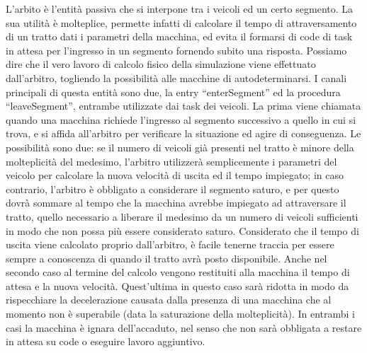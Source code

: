 L’arbito è l’entità passiva che si interpone tra i veicoli ed un certo segmento. La sua utilità è molteplice, permette infatti di calcolare il tempo di attraversamento di un tratto dati i parametri della macchina, ed evita il formarsi di code di task in attesa per l’ingresso in un segmento fornendo subito una risposta. Possiamo dire che il vero lavoro di calcolo fisico della simulazione viene effettuato dall’arbitro, togliendo la possibilità alle macchine di autodeterminarsi.
I canali principali di questa entità sono due, la entry “enterSegment” ed la procedura “leaveSegment”, entrambe utilizzate dai task dei veicoli.
La prima viene chiamata quando una macchina richiede l’ingresso al segmento successivo a quello in cui si trova, e si affida all’arbitro per verificare la situazione ed agire di conseguenza.
Le possibilità sono due: se il numero di veicoli già presenti nel tratto è minore della molteplicità del medesimo, l’arbitro utilizzerà semplicemente i parametri del veicolo per calcolare la nuova velocità di uscita ed il tempo impiegato; in caso contrario, l’arbitro è obbligato a considerare il segmento saturo, e per questo dovrà sommare al tempo che la macchina avrebbe impiegato ad attraversare il tratto,  quello necessario a liberare il medesimo da un numero di veicoli sufficienti in modo che non possa più essere considerato saturo. Considerato che il tempo di uscita viene calcolato proprio dall’arbitro, è facile tenerne traccia per essere sempre a conoscenza di quando il tratto avrà posto disponibile. Anche nel secondo caso al termine del calcolo vengono restituiti alla macchina il tempo di attesa e la nuova velocità. Quest’ultima in questo caso sarà ridotta in modo da rispecchiare la decelerazione causata dalla presenza di una macchina che al momento non è superabile (data la saturazione della molteplicità).
In entrambi i casi la macchina è ignara dell’accaduto, nel senso che non sarà obbligata a restare in attesa su code o eseguire lavoro aggiuntivo.
